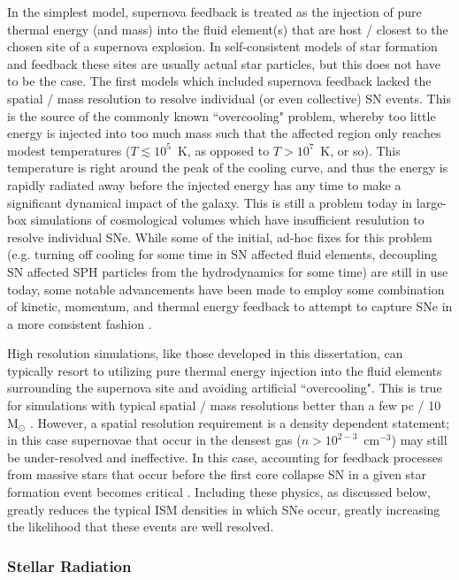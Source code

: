 In the simplest model, supernova feedback is treated as the injection of pure thermal energy (and mass) into the fluid element(s) that are host / closest to the chosen site of a supernova explosion. In self-consistent models of star formation and feedback these sites are usually actual star particles, but this does not have to be the case. The first models which included supernova feedback lacked the spatial / mass resolution to resolve individual (or even collective) SN events. This is the source of the commonly known ``overcooling" problem, whereby too little energy is injected into too much mass such that the affected region only reaches modest temperatures ($T \lesssim 10^5$~K, as opposed to $T > 10^7$~K, or so). This temperature is right around the peak of the cooling curve, and thus the energy is rapidly radiated away before the injected energy has any time to make a significant dynamical impact of the galaxy. This is still a problem today in large-box simulations of cosmological volumes which have insufficient resulution to resolve individual SNe. While some of the initial, ad-hoc fixes for this problem (e.g. turning off cooling for some time in SN affected fluid elements, decoupling SN affected SPH particles from the hydrodynamics for some time) are still in use today, some notable advancements have been made to employ some combination of kinetic, momentum, and thermal energy feedback to attempt to capture SNe in a more consistent fashion \citep[e.g.][]{Hopkins2014,Simpson2015,Hopkins2018}.

High resolution simulations, like those developed in this dissertation, can typically resort to utilizing pure thermal energy injection into the fluid elements surrounding the supernova site and avoiding artificial ``overcooling". This is true for simulations with typical spatial / mass resolutions better than a few pc / 10 M$_{\odot}$ \citep{Simpson2015,Hu2018,Smith2018b}. However, a spatial resolution requirement is a density dependent statement; in this case supernovae that occur in the densest gas ($n > 10^{2-3}$~cm$^{-3}$) may still be under-resolved and ineffective. In this case, accounting for feedback processes from massive stars that occur before the first core collapse SN in a given star formation event becomes critical \citep{Hu2016}. Including these physics, as discussed below, greatly reduces the typical ISM densities in which SNe occur, greatly increasing the likelihood that these events are well resolved.

\subsubsection{Stellar Radiation}
\label{intro:sec:radiation}

